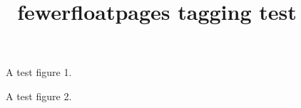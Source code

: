 \documentclass{article}
\title{fewerfloatpages tagging test}
\begin{document}
\lipsum[1]
\lipsum[1]
\lipsum[1]
\lipsum[1]

\begin{figure}
  \centering
  \lipsum[1]
  \lipsum[1]
  \lipsum[1]
  \caption{A test figure 1.}
\end{figure}

\begin{figure}
  \centering
    \lipsum[1]
\lipsum[1]
  \caption{A test figure 2.}
\end{figure}

\lipsum[1]
\lipsum[1]
\lipsum[1]
\lipsum[1]
\lipsum[1]
\lipsum[1]
\lipsum[1]
\lipsum[1]
\lipsum[1]
\lipsum[1]
\lipsum[1]
\lipsum[1]
\lipsum[1]
\lipsum[1]
\lipsum[1]
\end{document}
